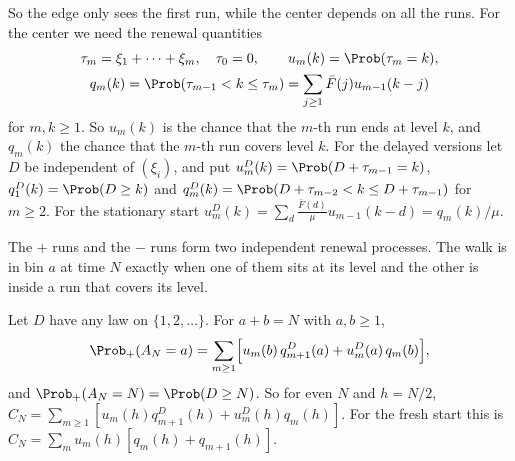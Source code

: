 So the edge only sees the first run, while the center depends on all the runs.
For the center we need the renewal quantities
\begin{gather*}
 \tau_m=\xi_1+\dots+\xi_m,\quad\tau_0=0,\qquad u_m(k)=\Prob(\tau_m=k),\\
 q_m(k)=\Prob(\tau_{m-1}<k\le\tau_m)=\sum_{j\ge1}\bar F(j)u_{m-1}(k-j)
\end{gather*}
for $m,k\ge1$. So $u_m(k)$ is the chance that the $m$-th run ends at level $k$,
and $q_m(k)$ the chance that the $m$-th run covers level $k$. For the delayed
versions let $D$ be independent of $(\xi_i)$, and put
$u^D_m(k)=\Prob(D+\tau_{m-1}=k)$, $q^D_1(k)=\Prob(D\ge k)$ and
$q^D_m(k)=\Prob(D+\tau_{m-2}<k\le D+\tau_{m-1})$ for $m\ge2$. For the
stationary start
$u^D_m(k)=\sum_d\frac{\bar F(d)}{\mu}u_{m-1}(k-d)=q_m(k)/\mu$.

The $+$ runs and the $-$ runs form two independent renewal processes. The walk
is in bin $a$ at time $N$ exactly when one of them sits at its level and the
other is inside a run that covers its level.

\begin{proposition}\label{prop:tworenewal}
Let $D$ have any law on $\{1,2,\dots\}$. For $a+b=N$ with $a,b\ge1$,
\[
 \Prob_+(A_N=a)=\sum_{m\ge1}\Bigl[u_m(b)\,q^D_{m+1}(a)+u^D_m(a)\,q_m(b)\Bigr],
\]
and $\Prob_+(A_N=N)=\Prob(D\ge N)$. So for even $N$ and $h=N/2$,
$C_N=\sum_{m\ge1}[u_m(h)q^D_{m+1}(h)+u^D_m(h)q_m(h)]$. For the fresh start
this is $C_N=\sum_mu_m(h)[q_m(h)+q_{m+1}(h)]$.
\end{proposition}


